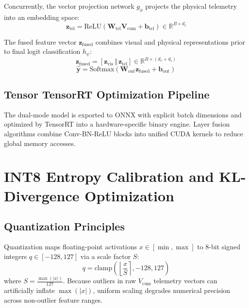 \documentclass[10pt,journal,compsoc]{IEEEtran}
\begin{document}
Concurrently, the vector projection network $g_{\phi}$ projects the physical telemetry into an embedding space:
\begin{equation}
\mathbf{z}_{\text{tel}} = \text{ReLU}\left(\mathbf{W}_{\text{tel}} \mathbf{V}_{\text{cum}} + \mathbf{b}_{\text{tel}}\right) \in \mathbb{R}^{B \times d_t}
\end{equation}

The fused feature vector $\mathbf{z}_{\text{fused}}$ combines visual and physical representations prior to final logit classification $h_{\psi}$:
\begin{equation}
\mathbf{z}_{\text{fused}} = [\mathbf{z}_{\text{vis}} \, \Vert \, \mathbf{z}_{\text{tel}}] \in \mathbb{R}^{B \times (d_v + d_t)}
\end{equation}
\begin{equation}
\mathbf{\hat{y}} = \text{Softmax}\left(\mathbf{W}_{\text{out}} \mathbf{z}_{\text{fused}} + \mathbf{b}_{\text{out}}\right)
\end{equation}

\subsection{Tensor TensorRT Optimization Pipeline}
The dual-mode model is exported to ONNX with explicit batch dimensions and optimized by TensorRT into a hardware-specific binary engine. Layer fusion algorithms combine Conv-BN-ReLU blocks into unified CUDA kernels to reduce global memory accesses.

\section{INT8 Entropy Calibration and KL-Divergence Optimization}

\subsection{Quantization Principles}
Quantization maps floating-point activations $x \in [\min, \max]$ to 8-bit signed integers $q \in [-128, 127]$ via a scale factor $S$:
\begin{equation}
q = \text{clamp}\left(\left\lfloor \frac{x}{S} \right\rceil, -128, 127\right)
\end{equation}
where $S = \frac{\max(|x|)}{127}$. Because outliers in raw $V_{\text{cum}}$ telemetry vectors can artificially inflate $\max(|x|)$, uniform scaling degrades numerical precision across non-outlier feature ranges.
\end{document}
